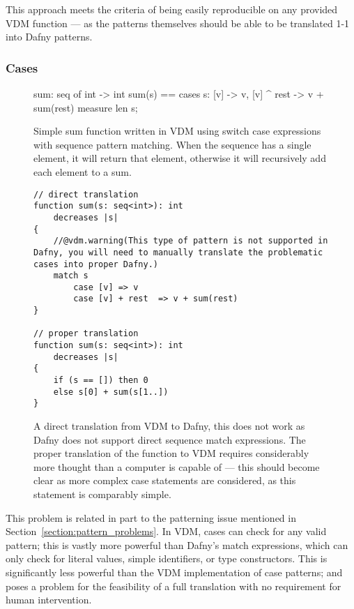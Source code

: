 \documentclass{entcs}
\begin{document}
This approach meets the criteria of being easily reproducible on any provided VDM function --- as the patterns themselves should be able to be translated 1-1 into Dafny patterns.

\subsubsection{Cases}\label{section:cases}

\begin{figure}[h]
	\begin{center}
        \begin{vdmsl}
sum: seq of int -> int
sum(s) == 
cases s:
    [v] -> v,
    [v] ^ rest -> v + sum(rest)
measure len s;
        \end{vdmsl}
		\caption{Simple sum function written in VDM using switch case expressions with sequence pattern matching. When the sequence has a single element, it will return that element, otherwise it will recursively add each element to a sum.}\label{fig:vdm_case_patterns}
	\end{center}
\end{figure}

\begin{figure}[h]
	\begin{center}
        \begin{lstlisting}
// direct translation
function sum(s: seq<int>): int 
    decreases |s|
{
    //@vdm.warning(This type of pattern is not supported in Dafny, you will need to manually translate the problematic cases into proper Dafny.)
    match s
        case [v] => v
        case [v] + rest  => v + sum(rest)
}

// proper translation
function sum(s: seq<int>): int 
    decreases |s|
{
    if (s == []) then 0
    else s[0] + sum(s[1..])
}
        \end{lstlisting}
		\caption{A direct translation from VDM to Dafny, this does not work as Dafny does not support direct sequence match expressions. The proper translation of the function to VDM requires considerably more thought than a computer is capable of --- this should become clear as more complex case statements are considered, as this statement is comparably simple.}\label{fig:dafny_bad_cases}
	\end{center}
\end{figure}

This problem is related in part to the patterning issue mentioned in Section~\ref{section:pattern_problems}. In VDM, cases can check for any valid pattern; this is vastly more powerful than Dafny's match expressions, which can only check for literal values, simple identifiers, or type constructors. This is significantly less powerful than the VDM implementation of case patterns; and poses a problem for the feasibility of a full translation with no requirement for human intervention. 
\end{document}

